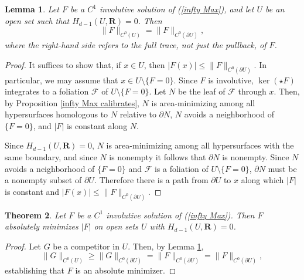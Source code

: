 \documentclass[reqno,11pt]{amsart}
\newcommand{\RR}{\mathbf{R}}
\newtheorem{theorem}{Theorem}[section]
\newtheorem{lemma}[theorem]{Lemma}
\theoremstyle{definition}
\numberwithin{equation}{section}
\begin{document}
\begin{lemma}\label{ABC inequality}
Let $F$ be a $C^1$ involutive solution of (\ref{infty Max}), and let $U$ be an open set such that $H_{d - 1}(U, \RR) = 0$.
Then 
$$\|F\|_{C^0(U)} = \|F\|_{C^0(\partial U)},$$
where the right-hand side refers to the full trace, not just the pullback, of $F$.
\end{lemma}
\begin{proof}
It suffices to show that, if $x \in U$, then $|F(x)| \leq \|F\|_{C^0(\partial U)}$.
In particular, we may assume that $x \in U \setminus \{F = 0\}$.
Since $F$ is involutive, $\ker(\star F)$ integrates to a foliation $\mathscr F$ of $U \setminus \{F = 0\}$.
Let $N$ be the leaf of $\mathscr F$ through $x$.
Then, by Proposition \ref{infty Max calibrates}, $N$ is area-minimizing among all hypersurfaces homologous to $N$ relative to $\partial N$, $N$ avoids a neighborhood of $\{F = 0\}$, and $|F|$ is constant along $N$.

Since $H_{d - 1}(U, \RR) = 0$, $N$ is area-minimizing among all hypersurfaces with the same boundary, and since $N$ is nonempty it follows that $\partial N$ is nonempty.
Since $N$ avoids a neighborhood of $\{F = 0\}$ and $\mathscr F$ is a foliation of $U \setminus \{F = 0\}$, $\partial N$ must be a nonempty subset of $\partial U$.
Therefore there is a path from $\partial U$ to $x$ along which $|F|$ is constant and $|F(x)| \leq \|F\|_{C^0(\partial U)}$.
\end{proof}

\begin{theorem}\label{tight and integrable implies infinity maxwell}
Let $F$ be a $C^1$ involutive solution of (\ref{infty Max}).
Then $F$ absolutely minimizes $|F|$ on open sets $U$ with $H_{d - 1}(U, \RR) = 0$.
\end{theorem}
\begin{proof}
Let $G$ be a competitor in $U$.
Then, by Lemma \ref{ABC inequality},
$$\|G\|_{C^0(U)} \geq \|G\|_{C^0(\partial U)} = \|F\|_{C^0(\partial U)} = \|F\|_{C^0(\partial U)},$$
establishing that $F$ is an absolute minimizer.
\end{proof}
\end{document}
